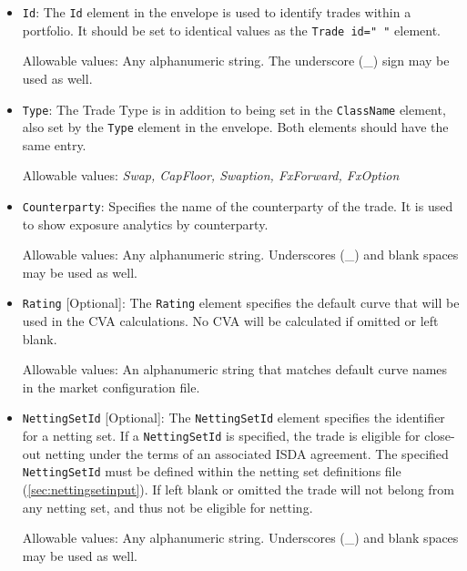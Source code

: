 \begin{itemize}
\item {\tt Id}: The {\tt Id} element in the envelope is used to identify trades within a portfolio. It should be set to identical values as the {\tt Trade id="   "} element.



Allowable values: Any alphanumeric string. The underscore (\_) sign may be used as well.

\item {\tt Type}: The Trade Type is in addition to being set in the {\tt ClassName} element, also set by the {\tt Type} element in the envelope. Both elements should have the same entry.



Allowable values: \emph{Swap, CapFloor, Swaption, FxForward, FxOption }

\item {\tt Counterparty}: Specifies the name of the counterparty of the trade.  It is used to show exposure analytics by counterparty. 



Allowable values: Any alphanumeric string. Underscores (\_) and blank spaces may be used as well. 

\item {\tt Rating} [Optional]: The {\tt Rating} element specifies the default curve that will be used in the CVA calculations.  No CVA will be calculated if omitted or left blank.
\vspace{1em}

Allowable values: An alphanumeric string that matches default curve names in the market configuration file.  

\item {\tt NettingSetId} [Optional]: The
  {\tt NettingSetId} element specifies the identifier for a
  netting set. If a \lstinline!NettingSetId! is specified, the trade
  is eligible for close-out netting under the terms of an associated
  ISDA agreement. The specified {\tt NettingSetId} must be
  defined within the netting set definitions file (\ref{sec:nettingsetinput}). If left blank or omitted the trade will not belong from any netting set, and thus not be eligible for netting.



Allowable values: Any alphanumeric string. Underscores (\_) and blank spaces may be used as well. 




\end{itemize}

